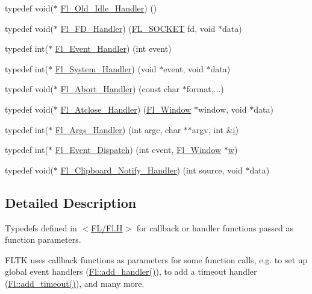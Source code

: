 \begin{DoxyCompactItemize}
typedef void($\ast$ \hyperlink{group__callback__functions_ga238786923bf2e91732a7305fc0647dbf}{Fl\+\_\+\+Old\+\_\+\+Idle\+\_\+\+Handler}) ()
\item 
typedef void($\ast$ \hyperlink{group__callback__functions_ga2cff1a51089da7653ab49bae499dfbf4}{Fl\+\_\+\+F\+D\+\_\+\+Handler}) (\hyperlink{_fl_8_h_a02134b1207d9eb2dce7f6f70e76c199a}{F\+L\+\_\+\+S\+O\+C\+K\+ET} fd, void $\ast$data)
\item 
typedef int($\ast$ \hyperlink{group__callback__functions_ga188f6b1dd8e78ccc91c013fe5c6bba74}{Fl\+\_\+\+Event\+\_\+\+Handler}) (int event)
\item 
typedef int($\ast$ \hyperlink{group__callback__functions_ga0cd86d9a18073304779213e82747ac8a}{Fl\+\_\+\+System\+\_\+\+Handler}) (void $\ast$event, void $\ast$data)
\item 
typedef void($\ast$ \hyperlink{group__callback__functions_gab06d501e53b8fe82de6d70937fb22f95}{Fl\+\_\+\+Abort\+\_\+\+Handler}) (const char $\ast$format,...)
\item 
typedef void($\ast$ \hyperlink{group__callback__functions_gac2b36f6e136744adb3e3ec87e068c169}{Fl\+\_\+\+Atclose\+\_\+\+Handler}) (\hyperlink{class_fl___window}{Fl\+\_\+\+Window} $\ast$window, void $\ast$data)
\item 
typedef int($\ast$ \hyperlink{group__callback__functions_ga6cb5354ccaa2a6619f2408dbb5203f3b}{Fl\+\_\+\+Args\+\_\+\+Handler}) (int argc, char $\ast$$\ast$argv, int \&\hyperlink{forms_8_h_acb559820d9ca11295b4500f179ef6392}{i})
\item 
typedef int($\ast$ \hyperlink{group__callback__functions_ga2fa80da592860bc4c0c1a06d36262601}{Fl\+\_\+\+Event\+\_\+\+Dispatch}) (int event, \hyperlink{class_fl___window}{Fl\+\_\+\+Window} $\ast$\hyperlink{forms_8_h_aac374e320caaadeca4874add33b62af2}{w})
\item 
typedef void($\ast$ \hyperlink{group__callback__functions_gae5e26cbad23960ff7ce4d50d82c74750}{Fl\+\_\+\+Clipboard\+\_\+\+Notify\+\_\+\+Handler}) (int source, void $\ast$data)
\end{DoxyCompactItemize}


\subsection{Detailed Description}
Typedefs defined in $<$\hyperlink{_fl_8_h}{F\+L/\+Fl.\+H}$>$ for callback or handler functions passed as function parameters. 

F\+L\+TK uses callback functions as parameters for some function calls, e.\+g. to set up global event handlers (\hyperlink{group__fl__events_ga04759d795ad0df6d5ee19e82aa92b3ec}{Fl\+::add\+\_\+handler()}), to add a timeout handler (\hyperlink{class_fl_a6a7f66c2bb04c04cb5252c0466f87022}{Fl\+::add\+\_\+timeout()}), and many more.


